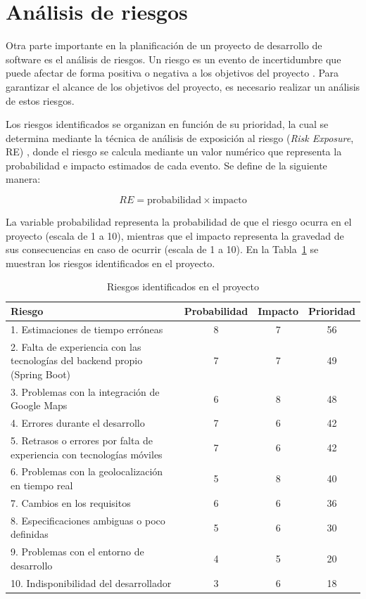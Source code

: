 \section{Análisis de riesgos}\label{cap:analisisRiesgos}

Otra parte importante en la planificación de un proyecto de desarrollo de software es el análisis de riesgos. Un riesgo es un evento de incertidumbre que puede afectar de forma positiva o negativa a los objetivos del proyecto \cite{pmbok}. Para garantizar el alcance de los objetivos del proyecto, es necesario realizar un análisis de estos riesgos.

Los riesgos identificados se organizan en función de su prioridad, la cual se determina mediante la técnica de análisis de exposición al riesgo (\textit{Risk Exposure}, RE) \cite{boehm}, donde el riesgo se calcula mediante un valor numérico que representa la probabilidad e impacto estimados de cada evento. Se define de la siguiente manera:

\begin{equation}
    RE = \text{probabilidad} \times \text{impacto}
\end{equation}

La variable probabilidad representa la probabilidad de que el riesgo ocurra en el proyecto (escala de 1 a 10), mientras que el impacto representa la gravedad de sus consecuencias en caso de ocurrir (escala de 1 a 10). En la Tabla~\ref{tab:riesgos} se muestran los riesgos identificados en el proyecto.

\begin{table}[ht!]
\centering
\begin{tabular}{|p{8cm}|c|c|c|}
\hline
\textbf{Riesgo} & \textbf{Probabilidad} & \textbf{Impacto} & \textbf{Prioridad} \\
\hline
1. Estimaciones de tiempo erróneas & 8 & 7 & 56 \\
\hline
2. Falta de experiencia con las tecnologías del backend propio (Spring Boot) & 7 & 7 & 49 \\
\hline
3. Problemas con la integración de Google Maps & 6 & 8 & 48 \\
\hline
4. Errores durante el desarrollo & 7 & 6 & 42 \\
\hline
5. Retrasos o errores por falta de experiencia con 
tecnologías móviles & 7 & 6 & 42 \\
\hline
6. Problemas con la geolocalización en tiempo real & 5 & 8 & 40 \\
\hline
7. Cambios en los requisitos & 6 & 6 & 36 \\
\hline
8. Especificaciones ambiguas o poco definidas & 5 & 6 & 30 \\
\hline
9. Problemas con el entorno de desarrollo & 4 & 5 & 20 \\
\hline
10. Indisponibilidad del desarrollador & 3 & 6 & 18 \\
\hline
\end{tabular}
\caption{Riesgos identificados en el proyecto}
\label{tab:riesgos}
\end{table}

